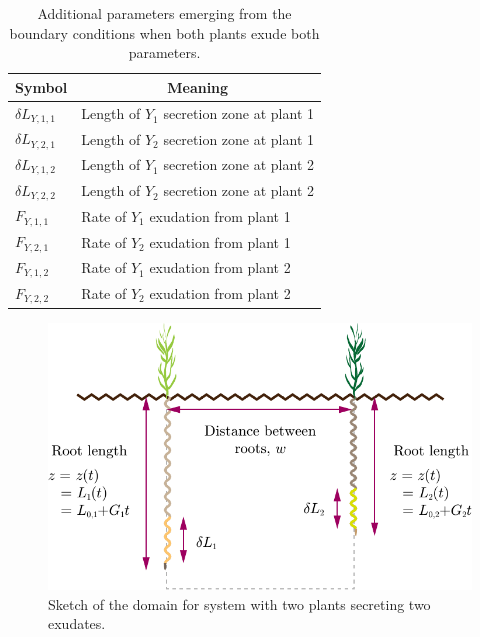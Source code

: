 \documentclass[11pt]{article}
\numberwithin{equation}{section}
\begin{document}
	
\begin{table}[!htb]
\begin{center}
\fontsize{9.5}{7}\selectfont
\setlength{\tabcolsep}{5.pt}
\def\arraystretch{2.0}
\begin{tabular}{ll}
\toprule
    \bf Symbol & \multicolumn{1}{c}{\bf Meaning}
    \\ \midrule
	$\delta L_{Y,1,1}$ & Length of $Y_1$ secretion zone at plant 1  \\
	$\delta L_{Y,2,1}$ & Length of $Y_2$ secretion zone at plant 1  \\
	$\delta L_{Y,1,2}$ &  Length of $Y_1$ secretion zone at plant 2 \\
	$\delta L_{Y,2,2}$ &  Length of $Y_2$ secretion zone at plant 2 \\
    $F_{Y,1,1} $ & Rate of $Y_1$ exudation from plant 1 \\
	$F_{Y,2,1} $ & Rate of $Y_2$ exudation from plant 1 \\
	$F_{Y,1,2} $ & Rate of $Y_1$ exudation from plant 2 \\
	$F_{Y,2,2} $ & Rate of $Y_2$ exudation from plant 2 \\
\bottomrule
\end{tabular}
\caption{Additional parameters emerging from the boundary conditions when both plants exude both parameters.
\label{t:Boundary-additional-parameters}}
\end{center}
\end{table}

\begin{figure}[!htb]
    \centering
    \includegraphics[scale=0.7]{Figures/Third-plot.pdf}
    \caption{Sketch of the domain for system with two plants secreting two exudates.}
    \label{fig:2roots-b}
\end{figure}
\end{document}
